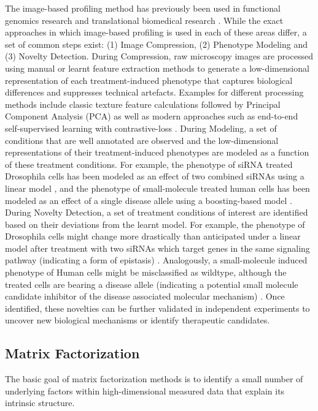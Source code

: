 \begin{flushleft}
The image-based profiling method has previously been used in functional genomics research \citep{billmannGeneticInteractionMap2016} and translational biomedical research \citep{gibsonStrategyIdentifyingRepurposed2015}. While the exact approaches in which image-based profiling is used in each of these areas differ, a set of common steps exist: (1) Image Compression, (2) Phenotype Modeling and (3) Novelty Detection. During Compression, raw microscopy images are processed using manual or learnt feature extraction methods to generate a low-dimensional representation of each treatment-induced phenotype that captures biological differences and suppresses technical artefacts. Examples for different processing methods include classic texture feature calculations followed by Principal Component Analysis (PCA) \citep{caicedoDataanalysisStrategiesImagebased2017} as well as modern approaches such as end-to-end self-supervised learning with contrastive-loss \citep{perakisContrastiveLearningSingleCell2021}. During Modeling, a set of conditions that are well annotated are observed and the low-dimensional representations of their treatment-induced phenotypes are modeled as a function of these treatment conditions. For example, the phenotype of siRNA treated Drosophila cells has been modeled as an effect of two combined siRNAs using a linear model \citep{billmannGeneticInteractionMap2016}, and the phenotype of small-molecule treated human cells has been modeled as an effect of a single disease allele using a boosting-based model \citep{gibsonStrategyIdentifyingRepurposed2015}. During Novelty Detection, a set of treatment conditions of interest are identified based on their deviations from the learnt model. For example, the phenotype of Drosophila cells might change more drastically than anticipated under a linear model after treatment with two siRNAs which target genes in the same signaling pathway (indicating a form of epistasis) \citep{billmannGeneticInteractionMap2016}. Analogously, a small-molecule induced phenotype of Human cells might be misclassified as wildtype, although the treated cells are bearing a disease allele (indicating a potential small molecule candidate inhibitor of the disease associated molecular mechanism) \citep{gibsonStrategyIdentifyingRepurposed2015}. Once identified, these novelties can be further validated in independent experiments to uncover new biological mechanisms or identify therapeutic candidates.
\par

\subsection{Matrix Factorization}
The basic goal of matrix factorization methods is to identify a small number of underlying factors within high-dimensional measured data that explain its intrinsic structure. 


\end{flushleft}
